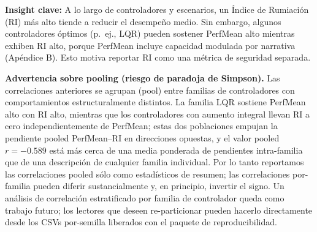 \documentclass{article}
\begin{document}
\textbf{Insight clave:} A lo largo de controladores y escenarios, un Índice de Rumiación (RI) más alto tiende a reducir el desempeño medio. Sin embargo, algunos controladores óptimos (p.\ ej., LQR) pueden sostener PerfMean alto mientras exhiben RI alto, porque PerfMean incluye capacidad modulada por narrativa (Apéndice B). Esto motiva reportar RI como una métrica de seguridad separada.

\textbf{Advertencia sobre pooling (riesgo de paradoja de Simpson).} Las correlaciones anteriores se agrupan (pool) entre familias de controladores con comportamientos estructuralmente distintos. La familia LQR sostiene PerfMean alto con RI alto, mientras que los controladores con aumento integral llevan RI a cero independientemente de PerfMean; estas dos poblaciones empujan la pendiente pooled PerfMean--RI en direcciones opuestas, y el valor pooled $r=-0.589$ está más cerca de una media ponderada de pendientes intra-familia que de una descripción de cualquier familia individual. Por lo tanto reportamos las correlaciones pooled sólo como estadísticos de resumen; las correlaciones por-familia pueden diferir sustancialmente y, en principio, invertir el signo. Un análisis de correlación estratificado por familia de controlador queda como trabajo futuro; los lectores que deseen re-particionar pueden hacerlo directamente desde los CSVs por-semilla liberados con el paquete de reproducibilidad.
\end{document}
